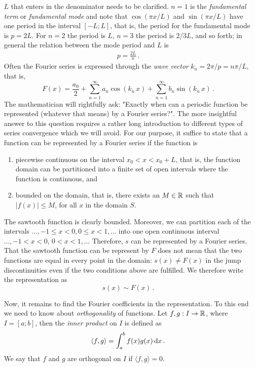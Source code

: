 \noindent $L$ that enters in the denominator needs to be clarified. $n=1$ is the 
\emph{fundamental term} or \emph{fundamental mode} and note that 
$\cos(\pi x/L)$ and $\sin(\pi x/L)$ have one period in the interval $[-L; L]$, 
that is, the period for the fundamental mode is $p=2L$. 
For $n=2$ the period is $L$, $n=3$ the period is $2/3L$, and so forth;  
in general the relation between the mode period and $L$ is 
\begin{eqnarray}
	p = \frac{2L}{n} \, .
\end{eqnarray}
Often the Fourier series is expressed through the \emph{wave vector} $k_n=2\pi/p = n\pi/L$, that is,
\begin{equation}
	F(x) = \frac{a_0}{2} + \sum_{n=1}^\infty a_n \cos\left(k_n \, x\right) 
	+ \sum_{n=1}^\infty b_n \sin\left(k_n\, x\right) \, .
\end{equation} 
The mathematician will rightfully ask: "Exactly when can a periodic function be represented 
(whatever that means) by a Fourier series?". The more insightful answer to this question 
requires a rather long introduction to different types of series 
convergence which we will avoid. For our purpose, it suffice to state that a
function can be represented by a Fourier series if the function is
\begin{enumerate}
	\item piecewise continuous on the interval $x_0 < x < x_0 + L$, 
		that is,  the function domain can be partitioned into a finite set of open 
		intervals where the function is continuous, and 
	\item bounded on the domain, that is, there exists an 
		$M \in \mathbb{R}$ such that $|f(x)| \leq M$, for all $x$ in the domain $S$.
\end{enumerate}
The sawtooth function is clearly bounded. Moreover, we can partition each of the intervals 
$\ldots, -1 \leq x < 0, 0 \leq x < 1, \ldots$ into one open continuous interval 
$\ldots, -1 < x <0$, $0 < x < 1, \ldots$ Therefore, $s$ can be represented by a
Fourier series. That the sawtooth function can be represent by $F$ does not mean that the two
functions are equal in every point in the domain: $s(x) \neq F(x)$ 
in the jump discontinuities even if the two conditions above are fulfilled. We
therefore write the representation as
\begin{equation}
	\label{eq:sawtoothFourier}
	s(x)  \sim F(x) \, .
\end{equation}

Now, it remains to find the Fourier coefficients in the representation. 
To this end we need to know about \emph{orthogonality} of functions. Let $f,g: I \rightarrow \mathbb{R}$, 
where $I = [a; b]$, then the \emph{inner product} on $I$ is defined as
\begin{eqnarray}
	\label{eq:innerdef}
	\langle f,g\rangle= \int_a^b f(x) g(x) \, \mathrm{d} x \, .
\end{eqnarray}
We say that $f$ and $g$ are orthogonal on $I$ if $\langle f,g \rangle = 0$. 

